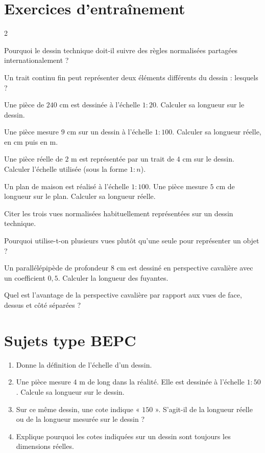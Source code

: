 \section{Exercices d'entraînement}
\begin{multicols}{2}

\exo{} Pourquoi le dessin technique doit-il suivre des règles normalisées
partagées internationalement ?

\exo{} Un trait continu fin peut représenter deux éléments différents du dessin :
lesquels ?

\exo{} Une pièce de $240$ cm est dessinée à l'échelle $1{:}20$. Calculer sa
longueur sur le dessin.

\exo{} Une pièce mesure $9$ cm sur un dessin à l'échelle $1{:}100$. Calculer sa
longueur réelle, en cm puis en m.

\exo{} Une pièce réelle de $2$ m est représentée par un trait de $4$ cm sur le
dessin. Calculer l'échelle utilisée (sous la forme $1{:}n$).

\exo{} Un plan de maison est réalisé à l'échelle $1{:}100$. Une pièce mesure
$5$ cm de longueur sur le plan. Calculer sa longueur réelle.

\exo{} Citer les trois vues normalisées habituellement représentées sur un dessin
technique.

\exo{} Pourquoi utilise-t-on plusieurs vues plutôt qu'une seule pour représenter
un objet ?

\exo{} Un parallélépipède de profondeur $8$ cm est dessiné en perspective
cavalière avec un coefficient $0{,}5$. Calculer la longueur des fuyantes.

\exo{} Quel est l'avantage de la perspective cavalière par rapport aux vues de
face, dessus et côté séparées ?

\end{multicols}

\section{Sujets type BEPC}

\begin{enumerate}[label=\arabic*)]
\item Donne la définition de l'échelle d'un dessin.
\item Une pièce mesure $4$ m de long dans la réalité. Elle est dessinée à l'échelle
$1{:}50$. Calcule sa longueur sur le dessin.
\item Sur ce même dessin, une cote indique « $150$ ». S'agit-il de la longueur réelle ou
de la longueur mesurée sur le dessin ?
\item Explique pourquoi les cotes indiquées sur un dessin sont toujours les dimensions
réelles.
\end{enumerate}


